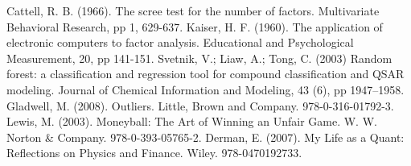 \documentclass[letterpaper, 10 pt, conference]{ieeeconf}
\begin{document}
\begin{thebibliography}{99}

 Cattell, R. B. (1966). The scree test for the number of factors. Multivariate Behavioral Research, pp 1, 629-637.
 Kaiser, H. F. (1960). The application of electronic computers to factor analysis. Educational and Psychological Measurement, 20, pp 141-151.
 Svetnik, V.; Liaw, A.; Tong, C. (2003) Random forest: a classification and regression tool for compound classification and QSAR modeling. Journal of Chemical Information and Modeling, 43 (6), pp 1947–1958.
 Gladwell, M. (2008). Outliers. Little, Brown and Company. 978-0-316-01792-3.
 Lewis, M. (2003). Moneyball: The Art of Winning an Unfair Game. W. W. Norton \& Company. 978-0-393-05765-2.
 Derman, E. (2007). My Life as a Quant: Reflections on Physics and Finance. Wiley. 978-0470192733.


\end{thebibliography}
\end{document}
